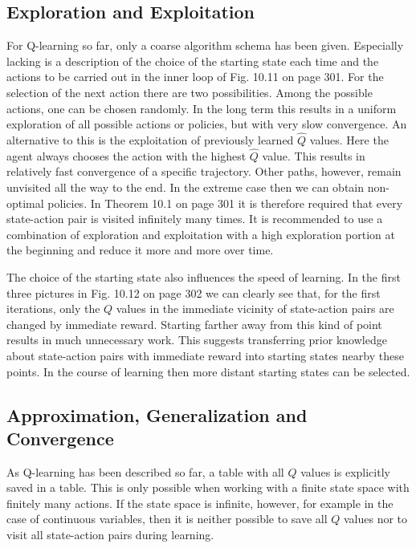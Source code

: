 \documentclass[10pt]{article}
\begin{document}
\subsection*{Exploration and Exploitation}
For Q-learning so far, only a coarse algorithm schema has been given. Especially lacking is a description of the choice of the starting state each time and the actions to be carried out in the inner loop of Fig. 10.11 on page 301. For the selection of the next action there are two possibilities. Among the possible actions, one can be chosen randomly. In the long term this results in a uniform exploration of all possible actions or policies, but with very slow convergence. An alternative to this is the exploitation of previously learned $\hat{Q}$ values. Here the agent always chooses the action with the highest $\hat{Q}$ value. This results in relatively fast convergence of a specific trajectory. Other paths, however, remain unvisited all the way to the end. In the extreme case then we can obtain non-optimal policies. In Theorem 10.1 on page 301 it is therefore required that every state-action pair is visited infinitely many times. It is recommended to use a combination of exploration and exploitation with a high exploration portion at the beginning and reduce it more and more over time.

The choice of the starting state also influences the speed of learning. In the first three pictures in Fig. 10.12 on page 302 we can clearly see that, for the first iterations, only the $Q$ values in the immediate vicinity of state-action pairs are changed by immediate reward. Starting farther away from this kind of point results in much unnecessary work. This suggests transferring prior knowledge about state-action pairs with immediate reward into starting states nearby these points. In the course of learning then more distant starting states can be selected.

\subsection*{Approximation, Generalization and Convergence}
As Q-learning has been described so far, a table with all $Q$ values is explicitly saved in a table. This is only possible when working with a finite state space with finitely many actions. If the state space is infinite, however, for example in the case of continuous variables, then it is neither possible to save all $Q$ values nor to visit all state-action pairs during learning.
\end{document}

